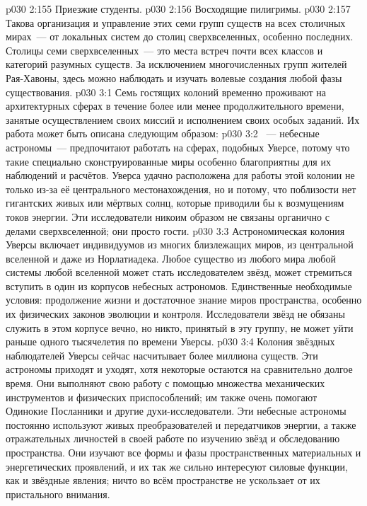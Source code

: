 \vs p030 2:155 Приезжие студенты.
\vs p030 2:156 Восходящие пилигримы.
\vs p030 2:157 \pc Такова организация и управление этих семи групп существ на всех столичных мирах~--- от локальных систем до столиц сверхвселенных, особенно последних. Столицы семи сверхвселенных~--- это места встреч почти всех классов и категорий разумных существ. За исключением многочисленных групп жителей Рая\hyp{}Хавоны, здесь можно наблюдать и изучать волевые создания любой фазы существования.
\vs p030 3:1 Семь гостящих колоний временно проживают на архитектурных сферах в течение более или менее продолжительного времени, занятые осуществлением своих миссий и исполнением своих особых заданий. Их работа может быть описана следующим образом:
\vs p030 3:2 ~--- небесные астрономы~--- предпочитают работать на сферах, подобных Уверсе, потому что такие специально сконструированные миры особенно благоприятны для их наблюдений и расчётов. Уверса удачно расположена для работы этой колонии не только из\hyp{}за её центрального местонахождения, но и потому, что поблизости нет гигантских живых или мёртвых солнц, которые приводили бы к возмущениям токов энергии. Эти исследователи никоим образом не связаны органично с делами сверхвселенной; они просто гости.
\vs p030 3:3 Астрономическая колония Уверсы включает индивидуумов из многих близлежащих миров, из центральной вселенной и даже из Норлатиадека. Любое существо из любого мира любой системы любой вселенной может стать исследователем звёзд, может стремиться вступить в один из корпусов небесных астрономов. Единственные необходимые условия: продолжение жизни и достаточное знание миров пространства, особенно их физических законов эволюции и контроля. Исследователи звёзд не обязаны служить в этом корпусе вечно, но никто, принятый в эту группу, не может уйти раньше одного тысячелетия по времени  Уверсы.
\vs p030 3:4 Колония звёздных наблюдателей Уверсы сейчас насчитывает более миллиона существ. Эти астрономы приходят и уходят, хотя некоторые остаются на сравнительно долгое время. Они выполняют свою работу с помощью множества механических инструментов и физических приспособлений; им также очень помогают Одинокие Посланники и другие духи\hyp{}исследователи. Эти небесные астрономы постоянно используют живых преобразователей и передатчиков энергии, а также отражательных личностей в своей работе по изучению звёзд и обследованию пространства. Они изучают все формы и фазы пространственных материальных и энергетических проявлений, и их так же сильно интересуют силовые функции, как и звёздные явления; ничто во всём пространстве не ускользает от их пристального внимания.
